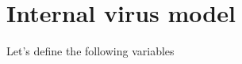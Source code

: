 \documentclass[12point]{article}
\begin{document}
\section{Internal virus model}
Let's define the following variables 
\end{document}
